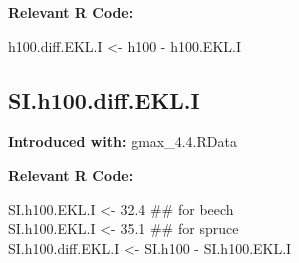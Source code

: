 \textbf{Relevant R Code:}

\begin{rcode}
  h100.diff.EKL.I <- h100 - h100.EKL.I
\end{rcode}

\subsection{SI.h100.diff.EKL.I}
\textbf{Introduced with:} gmax\_4.4.RData

\textbf{Relevant R Code:}

\begin{rcode}
  SI.h100.EKL.I <- 32.4  \#\# for beech \\
  SI.h100.EKL.I <- 35.1  \#\# for spruce \\
  SI.h100.diff.EKL.I <- SI.h100 - SI.h100.EKL.I
\end{rcode}

